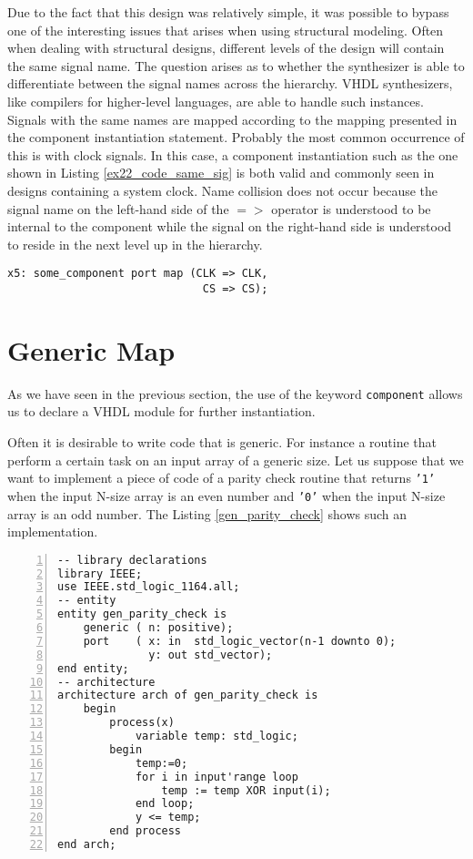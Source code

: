 Due to the fact that this design was relatively simple, it was possible to bypass one of the interesting issues that arises when using structural modeling. Often when dealing with structural designs, different levels of the design will contain the same signal name. The question arises as to whether the synthesizer is able to differentiate between the signal names across the hierarchy. VHDL synthesizers, like compilers for higher-level languages, are able to handle such instances. Signals with the same names are mapped according to the mapping presented in the component instantiation statement. Probably the most common occurrence of this is with clock signals. In this case, a component instantiation such as the one shown in Listing \ref{ex22_code_same_sig} is both valid and commonly seen in designs containing a system clock. Name collision does not occur because the signal name on the left-hand side of the $=>$ operator is understood to be internal to the component while the signal on the right-hand side is understood to reside in the next level up in the hierarchy.

\noindent
\begin{minipage}{0.99\linewidth}
\begin{lstlisting}[label=ex22_code_same_sig, caption=Example of the same signal name crossing hierarchical boundaries.]
x5: some_component port map (CLK => CLK,
                              CS => CS); 
\end{lstlisting}
\end{minipage}


\section{Generic Map}
As we have seen in the previous section, the use of the keyword \texttt{component} allows us to declare a VHDL module for further instantiation.

Often it is desirable to write code that is generic. For instance a routine that perform a certain task on an input array of a generic size. Let us suppose that we want to implement a piece of code of a parity check routine that returns \texttt{'1'} when the input N-size array is an even number and \texttt{'0'} when the input N-size array is an odd number. The Listing \ref{gen_parity_check} shows such an implementation.

\noindent
\begin{minipage}{0.99\linewidth}
\begin{lstlisting}[numbers=left, label=gen_parity_check, caption= Parity check implementation with generic input array size.]
-- library declarations
library IEEE;
use IEEE.std_logic_1164.all;
-- entity
entity gen_parity_check is
    generic ( n: positive);
    port    ( x: in  std_logic_vector(n-1 downto 0);
              y: out std_vector);
end entity;
-- architecture
architecture arch of gen_parity_check is
    begin
        process(x)
            variable temp: std_logic;
        begin
            temp:=0;
            for i in input'range loop
                temp := temp XOR input(i);
            end loop;
            y <= temp;
        end process
end arch;
\end{lstlisting}
\end{minipage}

